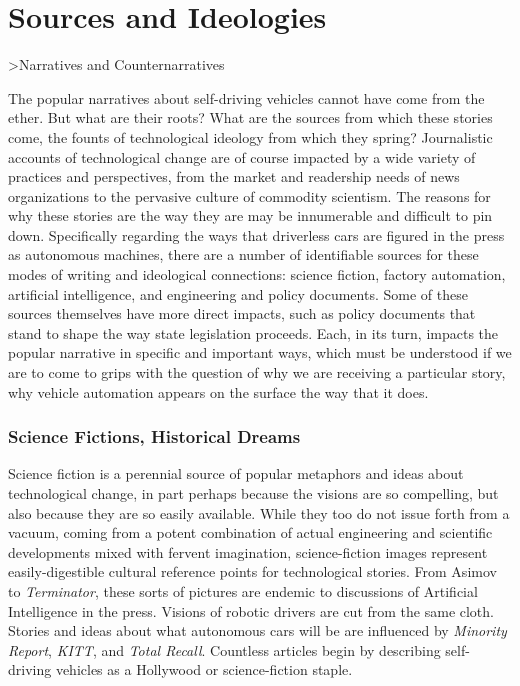 \chapter{Sources and Ideologies}
>Narratives and Counternarratives





The popular narratives about self-driving vehicles cannot have come from
the ether. But what are their roots? What are the sources from which
these stories come, the founts of technological ideology from which
they spring? Journalistic accounts of technological change are of
course impacted by a wide variety of practices and perspectives, from
the market and readership needs of news organizations to the pervasive
culture of commodity scientism.\cite{???-smithCommodityScientism} The
reasons for why these stories are the way they are may be innumerable
and difficult to pin down. Specifically regarding the ways that
driverless cars are figured in the press as autonomous machines, there
are a number of identifiable sources for these modes of writing and
ideological connections: science fiction, factory automation,
artificial intelligence, and engineering and policy documents. Some of
these sources themselves have more direct impacts, such as
policy documents that stand to shape the way state legislation proceeds. Each,
in its turn, impacts the popular narrative in specific and important
ways, which must be understood if we are to come to grips with the
question of why we are receiving a particular story, why vehicle
automation appears on the surface the way that it does.

\subsection{Science Fictions, Historical Dreams}

Science fiction is a perennial source of popular metaphors and ideas
about technological change, in part perhaps because the visions are so
compelling, but also because they are so easily available. While they
too do not issue forth from a vacuum, coming from a potent combination
of actual engineering and scientific developments mixed with fervent imagination,
science-fiction images represent easily-digestible cultural reference
points for technological stories. From Asimov to \emph{Terminator},
these sorts of pictures are endemic to discussions of Artificial
Intelligence in the press. Visions of robotic drivers are cut from the
same cloth. Stories and ideas about what autonomous cars will be are
influenced by \emph{Minority Report}, \emph{KITT}, and \emph{Total
  Recall}.\cite{???} Countless articles begin by describing
self-driving vehicles as a Hollywood or science-fiction
staple.\cite{???-http://seekingalpha.com/article/2798325-a-window-into-a-driverless-future-from-science-fiction-to-reality} 

